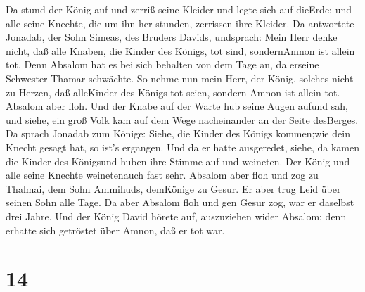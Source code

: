  Da stund der König auf und zerriß seine Kleider und legte
sich auf dieErde; und alle seine Knechte, die um ihn her stunden,
zerrissen ihre Kleider.  Da antwortete Jonadab, der Sohn
Simeas, des Bruders Davids, undsprach: Mein Herr denke nicht, daß alle
Knaben, die Kinder des Königs, tot sind, sondernAmnon ist allein tot.
Denn Absalom hat es bei sich behalten von dem Tage an, da erseine
Schwester Thamar schwächte.  So nehme nun mein Herr, der
König, solches nicht zu Herzen, daß alleKinder des Königs tot seien,
sondern Amnon ist allein tot.  Absalom aber floh. Und der
Knabe auf der Warte hub seine Augen aufund sah, und siehe, ein groß Volk
kam auf dem Wege nacheinander an der Seite desBerges.  Da
sprach Jonadab zum Könige: Siehe, die Kinder des Königs kommen;wie dein
Knecht gesagt hat, so ist's ergangen.  Und da er hatte
ausgeredet, siehe, da kamen die Kinder des Königsund huben ihre Stimme
auf und weineten. Der König und alle seine Knechte weinetenauch fast
sehr.  Absalom aber floh und zog zu Thalmai, dem Sohn
Ammihuds, demKönige zu Gesur. Er aber trug Leid über seinen Sohn alle
Tage.  Da aber Absalom floh und gen Gesur zog, war er
daselbst drei Jahre.  Und der König David hörete auf,
auszuziehen wider Absalom; denn erhatte sich getröstet über Amnon, daß
er tot war.

\hypertarget{section-13}{%
\section{14}\label{section-13}}

